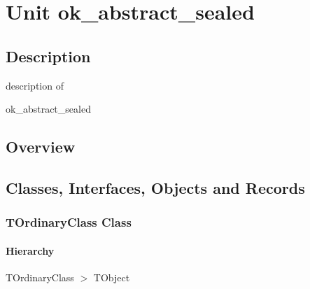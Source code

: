 \documentclass{report}
\newif\ifpdf
\begin{document}
\label{toc}\tableofcontents
\newpage
\newlength{\tmplength}
\chapter{Unit ok{\_}abstract{\_}sealed}
\label{ok_abstract_sealed}
\section{Description}
description of \begin{ttfamily}ok{\_}abstract{\_}sealed\end{ttfamily}
\section{Overview}
\begin{description}
\item[\texttt{\begin{ttfamily}TOrdinaryClass\end{ttfamily} Class}]
\item[\texttt{\begin{ttfamily}TAbstractClass\end{ttfamily} Class}]
\item[\texttt{\begin{ttfamily}TSealedClass\end{ttfamily} Class}]
\end{description}
\section{Classes, Interfaces, Objects and Records}
\ifpdf
\subsection*{\large{\textbf{TOrdinaryClass Class}}\normalsize\hspace{1ex}\hrulefill}
\else
\subsection*{TOrdinaryClass Class}
\fi
\label{ok_abstract_sealed.TOrdinaryClass}
\subsubsection*{\large{\textbf{Hierarchy}}\normalsize\hspace{1ex}\hfill}
TOrdinaryClass {$>$} TObject
\end{document}

